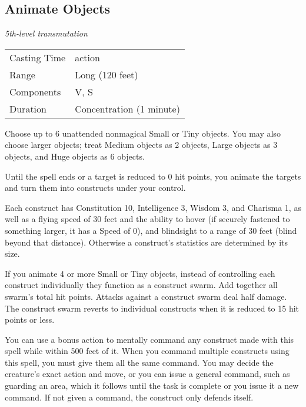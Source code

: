 \subsection{Animate Objects}\label{spell-animate-objects}

\emph{5th-level transmutation}

\begin{longtable}[]{@{}
  >{\raggedright\arraybackslash}p{}
  >{\raggedright\arraybackslash}p{}@{}}
\toprule\noalign{}
\endhead
\bottomrule\noalign{}
\endlastfoot
Casting Time & 1 action \\
Range & Long (120 feet) \\
Components & V, S \\
Duration & Concentration (1 minute) \\
\end{longtable}

Choose up to 6 unattended nonmagical Small or Tiny objects. You may also
choose larger objects; treat Medium objects as 2 objects, Large objects
as 3 objects, and Huge objects as 6 objects.

Until the spell ends or a target is reduced to 0 hit points, you animate
the targets and turn them into constructs under your control.

Each construct has Constitution 10, Intelligence 3, Wisdom 3, and
Charisma 1, as well as a flying speed of 30 feet and the ability to
hover (if securely fastened to something larger, it has a Speed of 0),
and blindsight to a range of 30 feet (blind beyond that distance).
Otherwise a construct's statistics are determined by its size.

If you animate 4 or more Small or Tiny objects, instead of controlling
each construct individually they function as a construct swarm. Add
together all swarm's total hit points. Attacks against a construct swarm
deal half damage. The construct swarm reverts to individual constructs
when it is reduced to 15 hit points or less.

You can use a bonus action to mentally command any construct made with
this spell while within 500 feet of it. When you command multiple
constructs using this spell, you must give them all the same command.
You may decide the creature's exact action and move, or you can issue a
general command, such as guarding an area, which it follows until the
task is complete or you issue it a new command. If not given a command,
the construct only defends itself.

